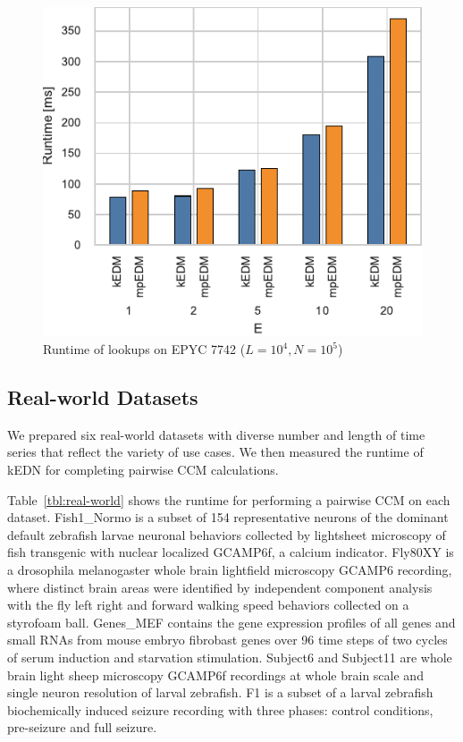 \documentclass[sigconf]{acmart}
\begin{document}
\begin{figure}
    \centering
    \includegraphics[width=.90\linewidth]{figs/runtime_lookup_epyc}
    \caption{Runtime of lookups on EPYC 7742 ($L=10^4, N=10^5$)}%
    \label{fig:breakdown-lookup-epyc}
\end{figure}

\subsection{Real-world Datasets}

We prepared six real-world datasets with diverse number and length of time
series that reflect the variety of use cases. We then measured the runtime of kEDN for completing pairwise CCM calculations.

Table~\ref{tbl:real-world} shows the runtime for performing a pairwise CCM on
each dataset.
Fish1\_Normo is a subset of 154 representative neurons of the dominant default zebrafish larvae neuronal behaviors collected by lightsheet microscopy of fish transgenic with nuclear localized GCAMP6f, a calcium indicator. Fly80XY is a drosophila melanogaster whole brain lightfield microscopy GCAMP6 recording, where distinct brain areas were identified by independent component analysis with the fly left right and forward walking speed behaviors collected on a styrofoam ball. Genes\_MEF contains the gene expression profiles of all genes and small RNAs from mouse embryo fibrobast genes over 96 time steps of two cycles of serum induction and starvation stimulation. Subject6 and Subject11 are whole brain light sheep microscopy GCAMP6f recordings at whole brain scale and single neuron resolution of larval zebrafish. F1 is a subset of a larval zebrafish biochemically induced seizure recording with three phases: control conditions, pre-seizure and full seizure.
\end{document}
